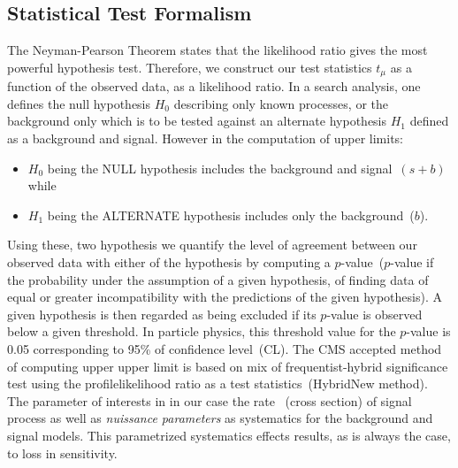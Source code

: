 \subsection{Statistical Test Formalism}
The Neyman-Pearson Theorem states that the likelihood ratio gives the most powerful hypothesis test. Therefore, we construct our test statistics $t_\mu$ as a function of the observed data, as a likelihood ratio.
In a search analysis, one defines the null hypothesis $H_{0}$ describing only known processes, or the background only which is to be tested against an alternate hypothesis $H_{1}$ defined as a background  and signal. However in the computation of upper limits:
\begin{itemize}
\item $H_{0}$ being the NULL hypothesis includes the background and signal~$(s + b)$ while
\item $H_{1}$ being the ALTERNATE hypothesis includes only the  background~($b$). 
\end{itemize}

Using these, two hypothesis we quantify the level of agreement between our observed data with either of the hypothesis by computing a $p$-value~($p$-value if the probability under the assumption of a given hypothesis, of finding data of equal or greater incompatibility with the predictions of the given hypothesis).
A given hypothesis is then regarded as being excluded if its $p$-value is observed below a given threshold. In particle physics, this threshold value for the $p$-value is 0.05 corresponding to 95\% of confidence level~(CL).
The CMS accepted method of computing upper upper limit is based on mix of frequentist-hybrid significance test using the profilelikelihood ratio as a test statistics~(HybridNew method). 
The parameter of interests in in our case the rate ~(cross section) of signal process as well as \textit{nuissance parameters} as systematics for the background and signal models. This parametrized systematics effects results, as is always the case, to loss in sensitivity.

